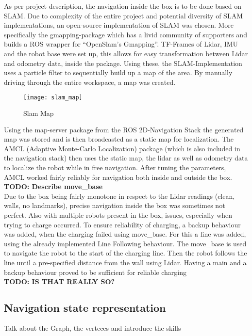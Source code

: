     As per project description, the navigation inside the box is to be done based on SLAM. 
    Due to complexity of the entire project and potential diversity of SLAM implementations, an open-source implementation of SLAM was chosen. 
    More specifically the gmapping-package \cite{gmapping} which has a livid community of supporters and builds a ROS wrapper for “OpenSlam's Gmapping”\cite{openslam}. 
    TF-Frames of Lidar, IMU and the robot base were set up, this allows for easy transformation between Lidar and odometry data, inside the package. 
    Using these, the SLAM-Implementation uses a particle filter to sequentially build up a map of the area. 
    By manually driving through the entire workspace, a map was created. 
    \begin{figure}[H]
        \centering
        \texttt{[image: slam\_map]}
        \caption{Slam Map}
        \label{fig:slam_map}
    \end{figure}
    Using the map-server package from the ROS 2D-Navigation Stack \cite{navigation_stack} the generated map was stored and is then broadcasted as a static map for localization. 
    The AMCL (Adaptive Monte-Carlo Localization) package (which is also included in the navigation stack) then uses the static map, the lidar as well as odometry data to localize the robot while in free navigation. 
    After tuning the parameters, AMCL worked fairly reliably for navigation both inside and outside the box.\\
    \textbf{TODO: Describe move{\_}base}\\
    Due to the box being fairly monotone in respect to the Lidar readings (clean, walls, no landmarks), precise navigation inside the box was sometimes not perfect. 
    Also with multiple robots present in the box, issues, especially when trying to charge occurred. 
    To ensure reliability of charging, a backup behaviour was added, when the charging failed using move{\_}base. 
    For this a line was added, using the already implemented Line Following behaviour. 
    The move{\_}base is used to navigate the robot to the start of the charging line. Then the robot follows the line until a pre-specified distance from the wall using Lidar. 
    Having a main and a backup behaviour proved to be sufficient for reliable charging\\
    \textbf{TODO: IS THAT REALLY SO?}


    \subsection{Navigation state representation} %
    \label{sub:mr_navigation_state_representation}
    Talk about the Graph, the verteces and introduce the skills

